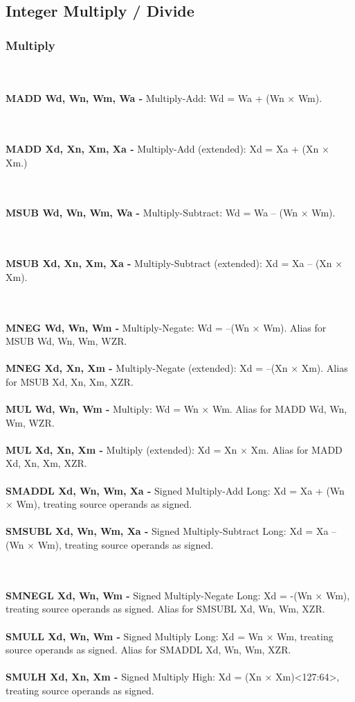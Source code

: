 \documentclass[12pt,a4paper,utf8]{ppgsi}
\begin{document}
\subsection{Integer Multiply / Divide}

\subsubsection{Multiply}

\\\\\textbf{MADD Wd, Wn, Wm, Wa -} Multiply-Add: Wd = Wa + (Wn × Wm). 

\\\\\textbf{MADD Xd, Xn, Xm, Xa -} Multiply-Add (extended): Xd = Xa + (Xn × Xm.) 

\\\\\textbf{MSUB Wd, Wn, Wm, Wa -} Multiply-Subtract: Wd = Wa – (Wn × Wm). 

\\\\\textbf{MSUB Xd, Xn, Xm, Xa -} Multiply-Subtract (extended): Xd = Xa – (Xn × Xm). 

\\\\\textbf{MNEG Wd, Wn, Wm -} Multiply-Negate: Wd = –(Wn × Wm).
Alias for MSUB Wd, Wn, Wm, WZR. 
\\\\\textbf{MNEG Xd, Xn, Xm -} Multiply-Negate (extended): Xd = –(Xn × Xm).
Alias for MSUB Xd, Xn, Xm, XZR. 
\\\\\textbf{MUL Wd, Wn, Wm -} Multiply: Wd = Wn × Wm.
Alias for MADD Wd, Wn, Wm, WZR. 
\\\\\textbf{MUL Xd, Xn, Xm -} Multiply (extended): Xd = Xn × Xm.
Alias for MADD Xd, Xn, Xm, XZR. 
\\\\\textbf{SMADDL Xd, Wn, Wm, Xa -} Signed Multiply-Add Long: Xd = Xa + (Wn × Wm), treating source operands as signed. 
\\\\\textbf{SMSUBL Xd, Wn, Wm, Xa -} Signed Multiply-Subtract Long: Xd = Xa – (Wn × Wm), treating source operands as signed. 

\\\\\textbf{SMNEGL Xd, Wn, Wm -} Signed Multiply-Negate Long: Xd = -(Wn × Wm), treating source operands as signed.
Alias for SMSUBL Xd, Wn, Wm, XZR.
\\\\\textbf{SMULL Xd, Wn, Wm -} Signed Multiply Long: Xd = Wn × Wm, treating source operands as signed.
Alias for SMADDL Xd, Wn, Wm, XZR.
\\\\\textbf{SMULH Xd, Xn, Xm -} Signed Multiply High: Xd = (Xn × Xm)<127:64>, treating source operands as signed. 
\end{document}
